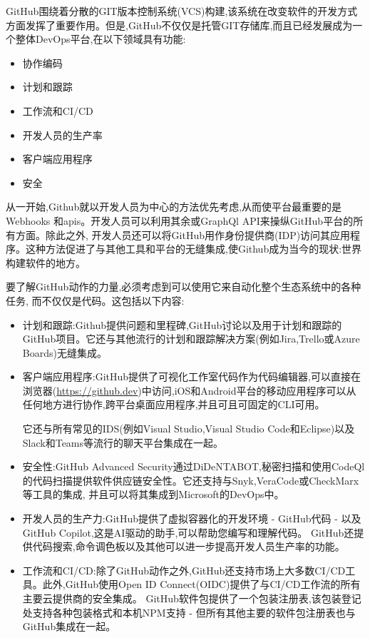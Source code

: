 GitHub围绕着分散的GIT版本控制系统(VCS)构建,该系统在改变软件的开发方式方面发挥了重要作用。但是,GitHub不仅仅是托管GIT存储库,而且已经发展成为一个整体DevOps平台,在以下领域具有功能:

\begin{itemize}
\item 
协作编码

\item
计划和跟踪

\item
工作流和CI/CD 

\item
开发人员的生产率

\item
客户端应用程序

\item
安全
\end{itemize}

从一开始,Github就以开发人员为中心的方法优先考虑,从而使平台最重要的是Webhooks 和apis。开发人员可以利用其余或GraphQl API来操纵GitHub平台的所有方面。除此之外, 开发人员还可以将GitHub用作身份提供商(IDP)访问其应用程序。这种方法促进了与其他工具和平台的无缝集成,使Github成为当今的现状:世界构建软件的地方。

要了解GitHub动作的力量,必须考虑到可以使用它来自动化整个生态系统中的各种任务, 而不仅仅是代码。这包括以下内容:

\begin{itemize}
\item
计划和跟踪:Github提供问题和里程碑,GitHub讨论以及用于计划和跟踪的GitHub项目。它还与其他流行的计划和跟踪解决方案(例如Jira,Trello或Azure Boards)无缝集成。

\item
客户端应用程序:GitHub提供了可视化工作室代码作为代码编辑器,可以直接在浏览器(\url{https://github.dev})中访问,iOS和Android平台的移动应用程序可以从任何地方进行协作,跨平台桌面应用程序,并且可且可固定的CLI可用。

它还与所有常见的IDS(例如Visual Studio,Visual Studio Code和Eclipse)以及Slack和Teams等流行的聊天平台集成在一起。

\item
安全性:GitHub Advanced Security通过DiDeNTABOT,秘密扫描和使用CodeQl的代码扫描提供软件供应链安全性。它还支持与Snyk,VeraCode或CheckMarx等工具的集成, 并且可以将其集成到Microsoft的DevOps中。

\item
开发人员的生产力:GitHub提供了虚拟容器化的开发环境 - GitHub代码 - 以及GitHub Copilot,这是AI驱动的助手,可以帮助您编写和理解代码。 GitHub还提供代码搜索,命令调色板以及其他可以进一步提高开发人员生产率的功能。

\item
工作流和CI/CD:除了GitHub动作之外,GitHub还支持市场上大多数CI/CD工具。此外,GitHub使用Open ID Connect(OIDC)提供了与CI/CD工作流的所有主要云提供商的安全集成。 GitHub软件包提供了一个包装注册表,该包装登记处支持各种包装格式和本机NPM支持 - 但所有其他主要的软件包注册表也与GitHub集成在一起。
\end{itemize}

